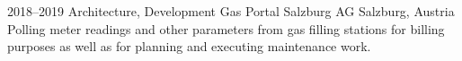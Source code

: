 \cventry
{2018--2019}
{Architecture, Development}
{Gas Portal}
{Salzburg AG}
{Salzburg, Austria}
{
  Polling meter readings and other parameters from gas filling stations
  for billing purposes as well as for planning and executing maintenance work.
}
